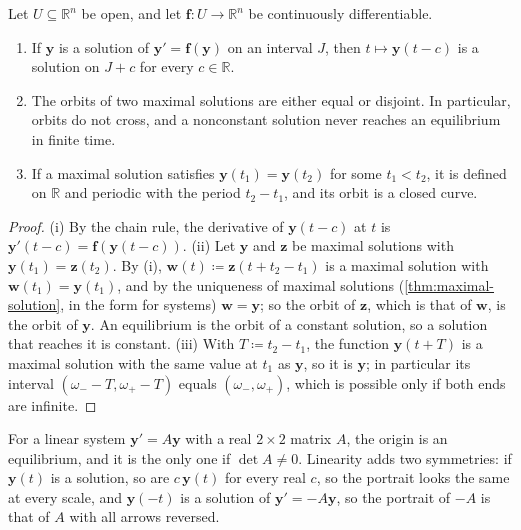 \begin{lemma}
\label{lem:orbits}
Let $U\subseteq\mathbb R^n$ be open, and let $\mathbf f\colon U\to\mathbb R^n$ be continuously differentiable.
\begin{enumerate}
\item If $\mathbf y$ is a solution of $\mathbf y'=\mathbf f(\mathbf y)$ on an interval $J$, then $t\mapsto\mathbf y(t-c)$ is a solution on $J+c$ for every $c\in\mathbb R$.
\item The orbits of two maximal solutions are either equal or disjoint. In particular, orbits do not cross, and a nonconstant solution never reaches an equilibrium in finite time.
\item If a maximal solution satisfies $\mathbf y(t_1)=\mathbf y(t_2)$ for some $t_1<t_2$, it is defined on $\mathbb R$ and periodic with the period $t_2-t_1$, and its orbit is a closed curve.
\end{enumerate}
\end{lemma}

\begin{proof}
(i) By the chain rule, the derivative of $\mathbf y(t-c)$ at $t$ is $\mathbf y'(t-c)=\mathbf f(\mathbf y(t-c))$. (ii) Let $\mathbf y$ and $\mathbf z$ be maximal solutions with $\mathbf y(t_1)=\mathbf z(t_2)$. By (i), $\mathbf w(t)\coloneqq\mathbf z(t+t_2-t_1)$ is a maximal solution with $\mathbf w(t_1)=\mathbf y(t_1)$, and by the uniqueness of maximal solutions (\cref{thm:maximal-solution}, in the form for systems) $\mathbf w=\mathbf y$; so the orbit of $\mathbf z$, which is that of $\mathbf w$, is the orbit of $\mathbf y$. An equilibrium is the orbit of a constant solution, so a solution that reaches it is constant. (iii) With $T\coloneqq t_2-t_1$, the function $\mathbf y(t+T)$ is a maximal solution with the same value at $t_1$ as $\mathbf y$, so it is $\mathbf y$; in particular its interval $(\omega_--T,\omega_+-T)$ equals $(\omega_-,\omega_+)$, which is possible only if both ends are infinite.
\end{proof}

For a linear system $\mathbf y'=A\mathbf y$ with a real $2\times2$ matrix $A$, the origin is an equilibrium, and it is the only one if $\det A\ne0$. Linearity adds two symmetries: if $\mathbf y(t)$ is a solution, so are $c\,\mathbf y(t)$ for every real $c$, so the portrait looks the same at every scale, and $\mathbf y(-t)$ is a solution of $\mathbf y'=-A\mathbf y$, so the portrait of $-A$ is that of $A$ with all arrows reversed.

